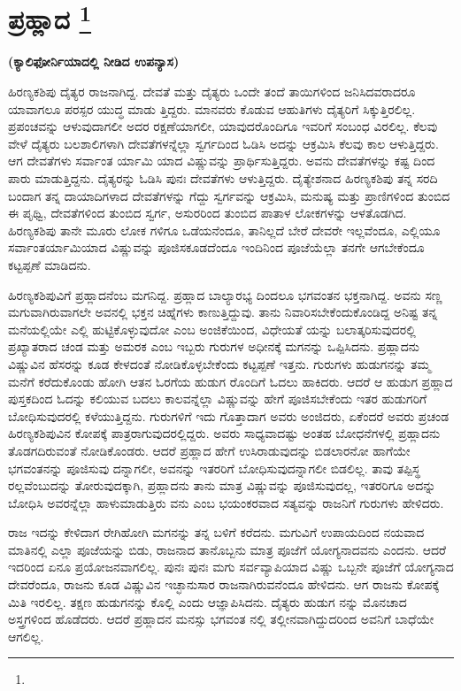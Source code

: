 
\chapter[ಪ್ರಹ್ಲಾದ]{ಪ್ರಹ್ಲಾದ \protect\footnote{}}

\centerline{\textbf{(ಕ್ಯಾಲಿಫೋರ್ನಿಯಾದಲ್ಲಿ ನೀಡಿದ ಉಪನ್ಯಾಸ)}}

ಹಿರಣ್ಯಕಶಿಪು ದೈತ್ಯರ ರಾಜನಾಗಿದ್ದ. ದೇವತೆ ಮತ್ತು ದೈತ್ಯರು ಒಂದೇ ತಂದೆ ತಾಯಿಗಳಿಂದ ಜನಿಸಿದವರಾದರೂ ಯಾವಾಗಲೂ ಪರಸ್ಪರ ಯುದ್ಧ ಮಾಡು ತ್ತಿದ್ದರು. ಮಾನವರು ಕೊಡುವ ಆಹುತಿಗಳು ದೈತ್ಯರಿಗೆ ಸಿಕ್ಕುತ್ತಿರಲಿಲ್ಲ. ಪ್ರಪಂಚವನ್ನು ಆಳುವುದಾಗಲೀ ಅದರ ರಕ್ಷಣೆಯಾಗಲೀ, ಯಾವುದರೊಂದಿಗೂ ಇವರಿಗೆ ಸಂಬಂಧ ವಿರಲಿಲ್ಲ. ಕೆಲವು ವೇಳೆ ದೈತ್ಯರು ಬಲಶಾಲಿಗಳಾಗಿ ದೇವತೆಗಳನ್ನೆಲ್ಲಾ ಸ್ವರ್ಗದಿಂದ ಓಡಿಸಿ ಅದನ್ನು ಆಕ್ರಮಿಸಿ ಕೆಲವು ಕಾಲ ಆಳುತ್ತಿದ್ದರು. ಆಗ ದೇವತೆಗಳು ಸರ್ವಾಂತ ರ್ಯಾಮಿ ಯಾದ ವಿಷ್ಣುವನ್ನು ಪ್ರಾರ್ಥಿಸುತ್ತಿದ್ದರು. ಅವನು ದೇವತೆಗಳನ್ನು ಕಷ್ಟ ದಿಂದ ಪಾರು ಮಾಡುತ್ತಿದ್ದನು. ದೈತ್ಯರನ್ನು ಓಡಿಸಿ ಪುನಃ ದೇವತೆಗಳು ಆಳುತ್ತಿದ್ದರು. ದೈತ್ಯೇಶನಾದ ಹಿರಣ್ಯಕಶಿಪು ತನ್ನ ಸರದಿ ಬಂದಾಗ ತನ್ನ ದಾಯಾದಿಗಳಾದ ದೇವತೆಗಳನ್ನು ಗೆದ್ದು ಸ್ವರ್ಗವನ್ನು ಆಕ್ರಮಿಸಿ, ಮನುಷ್ಯ ಮತ್ತು ಪ್ರಾಣಿಗಳಿಂದ ತುಂಬಿದ ಈ ಪೃಥ್ವಿ, ದೇವತೆಗಳಿಂದ ತುಂಬಿದ ಸ್ವರ್ಗ, ಅಸುರರಿಂದ ತುಂಬಿದ ಪಾತಾಳ ಲೋಕಗಳನ್ನು ಆಳತೊಡಗಿದ. ಹಿರಣ್ಯಕಶಿಪು ತಾನೇ ಮೂರು ಲೋಕ ಗಳಿಗೂ ಒಡೆಯನೆಂದೂ, ತಾನಿಲ್ಲದೆ ಬೇರೆ ದೇವರೇ ಇಲ್ಲವೆಂದೂ, ಎಲ್ಲಿಯೂ ಸರ್ವಾಂತರ್ಯಾಮಿಯಾದ ವಿಷ್ಣುವನ್ನು ಪೂಜಿಸಕೂಡದೆಂದೂ ಇಂದಿನಿಂದ ಪೂಜೆಯೆಲ್ಲಾ ತನಗೇ ಆಗಬೇಕೆಂದೂ ಕಟ್ಟಪ್ಪಣೆ ಮಾಡಿದನು.

ಹಿರಣ್ಯಕಶಿಪುವಿಗೆ ಪ್ರಹ್ಲಾದನೆಂಬ ಮಗನಿದ್ದ. ಪ್ರಹ್ಲಾದ ಬಾಲ್ಯಾರಭ್ಯ ದಿಂದಲೂ ಭಗವಂತನ ಭಕ್ತನಾಗಿದ್ದ. ಅವನು ಸಣ್ಣ ಮಗುವಾಗಿರುವಾಗಲೇ ಅವನಲ್ಲಿ ಭಕ್ತನ ಚಿಹ್ನೆಗಳು ಕಾಣುತ್ತಿದ್ದುವು. ತಾನು ನಿವಾರಿಸಬೇಕೆಂದುಕೊಂಡಿದ್ದ ಅನಿಷ್ಟ ತನ್ನ ಮನೆಯಲ್ಲಿಯೇ ಎಲ್ಲಿ ಹುಟ್ಟಿಕೊಳ್ಳುವುದೋ ಎಂಬ ಅಂಜಿಕೆಯಿಂದ, ವಿಧೇಯತೆ ಯನ್ನು ಬಲಾತ್ಕರಿಸುವುದರಲ್ಲಿ ಪ್ರಖ್ಯಾತರಾದ ಚಂಡ ಮತ್ತು ಅಮರಕ ಎಂಬ ಇಬ್ಬರು ಗುರುಗಳ ಅಧೀನಕ್ಕೆ ಮಗನನ್ನು ಒಪ್ಪಿಸಿದನು. ಪ್ರಹ್ಲಾದನು ವಿಷ್ಣುವಿನ ಹೆಸರನ್ನು ಕೂಡ ಕೇಳದಂತೆ ನೋಡಿಕೊಳ್ಳಬೇಕೆಂದು ಕಟ್ಟಪ್ಪಣೆ ಇತ್ತನು. ಗುರುಗಳು ಹುಡುಗನನ್ನು ತಮ್ಮ ಮನೆಗೆ ಕರೆದುಕೊಂಡು ಹೋಗಿ ಆತನ ಓರಗೆಯ ಹುಡುಗ ರೊಂದಿಗೆ ಓದಲು ಹಾಕಿದರು. ಆದರೆ ಆ ಹುಡುಗ ಪ್ರಹ್ಲಾದ ಪುಸ್ತಕದಿಂದ ಓದನ್ನು ಕಲಿಯುವ ಬದಲು ಕಾಲವನ್ನೆಲ್ಲಾ ವಿಷ್ಣುವನ್ನು ಹೇಗೆ ಪೂಜಿಸಬೇಕೆಂದು ಇತರ ಹುಡುಗರಿಗೆ ಬೋಧಿಸುವುದರಲ್ಲಿ ಕಳೆಯುತ್ತಿದ್ದನು. ಗುರುಗಳಿಗೆ ಇದು ಗೊತ್ತಾದಾಗ ಅವರು ಅಂಜಿದರು, ಏಕೆಂದರೆ ಅವರು ಪ್ರಚಂಡ ಹಿರಣ್ಯಕಶಿಪುವಿನ ಕೋಪಕ್ಕೆ ಪಾತ್ರರಾಗುವುದರಲ್ಲಿದ್ದರು. ಅವರು ಸಾಧ್ಯವಾದಷ್ಟು ಅಂತಹ ಬೋಧನೆಗಳಲ್ಲಿ ಪ್ರಹ್ಲಾದನು ತೊಡಗದಿರುವಂತೆ ನೋಡಿಕೊಂಡರು. ಆದರೆ ಪ್ರಹ್ಲಾದ ಹೇಗೆ ಉಸಿರಾಡುವುದನ್ನು ಬಿಡಲಾರನೋ ಹಾಗೆಯೇ ಭಗವಂತನನ್ನು ಪೂಜಿಸುವು ದನ್ನಾಗಲೀ, ಅವನನ್ನು ಇತರರಿಗೆ ಬೋಧಿಸುವುದನ್ನಾಗಲೀ ಬಿಡಲಿಲ್ಲ. ತಾವು ತಪ್ಪಿಸ್ಥ ರಲ್ಲವೆಂಬುದನ್ನು ತೋರುವುದಕ್ಕಾಗಿ, ಪ್ರಹ್ಲಾದನು ತಾನು ಮಾತ್ರ ವಿಷ್ಣುವನ್ನು ಪೂಜಿಸುವುದಲ್ಲ, ಇತರರಿಗೂ ಅದನ್ನು ಬೋಧಿಸಿ ಅವರನ್ನೆಲ್ಲಾ ಹಾಳುಮಾಡುತ್ತಿರು ವನು ಎಂಬ ಭಯಂಕರವಾದ ಸತ್ಯವನ್ನು ರಾಜನಿಗೆ ಗುರುಗಳು ಹೇಳಿದರು.

ರಾಜ ಇದನ್ನು ಕೇಳಿದಾಗ ರೇಗಿಹೋಗಿ ಮಗನನ್ನು ತನ್ನ ಬಳಿಗೆ ಕರೆದನು. ಮಗುವಿಗೆ ಉಪಾಯದಿಂದ ನಯವಾದ ಮಾತಿನಲ್ಲಿ ಎಲ್ಲಾ ಪೂಜೆಯನ್ನು ಬಿಡು, ರಾಜನಾದ ತಾನೊಬ್ಬನು ಮಾತ್ರ ಪೂಜೆಗೆ ಯೋಗ್ಯನಾದವನು ಎಂದನು. ಆದರೆ ಇದರಿಂದ ಏನೂ ಪ್ರಯೋಜನವಾಗಲಿಲ್ಲ. ಪುನಃ ಪುನಃ ಮಗು ಸರ್ವವ್ಯಾಪಿಯಾದ ವಿಷ್ಣು ಒಬ್ಬನೇ ಪೂಜೆಗೆ ಯೋಗ್ಯನಾದ ದೇವರೆಂದೂ, ರಾಜನು ಕೂಡ ವಿಷ್ಣುವಿನ ಇಚ್ಛಾನುಸಾರ ರಾಜನಾಗಿರುವನೆಂದೂ ಹೇಳಿದನು. ಆಗ ರಾಜನು ಕೋಪಕ್ಕೆ ಮಿತಿ ಇರಲಿಲ್ಲ. ತಕ್ಷಣ ಹುಡುಗನನ್ನು ಕೊಲ್ಲಿ ಎಂದು ಆಜ್ಞಾಪಿಸಿದನು. ದೈತ್ಯರು ಹುಡುಗ ನನ್ನು ಮೊನಚಾದ ಅಸ್ತ್ರಗಳಿಂದ ಹೊಡೆದರು. ಆದರೆ ಪ್ರಹ್ಲಾದನ ಮನಸ್ಸು ಭಗವಂತ ನಲ್ಲಿ ತಲ್ಲೀನವಾಗಿದ್ದುದರಿಂದ ಅವನಿಗೆ ಬಾಧೆಯೇ ಆಗಲಿಲ್ಲ.

